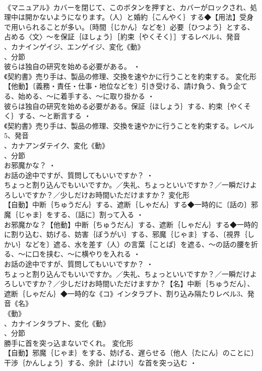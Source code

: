 \documentclass[8pt]{extreport}
\begin{document}
\begin{CJK}{UTF8}{min}
\\	《マニュアル》カバーを閉じて、このボタンを押すと、カバーがロックされ、処理中は開かないようになります。（人）と婚約｛こんやく｝する◆【用法】受身で用いられることが多い。〔時間｛じかん｝などを〕必要｛ひつよう｝とする、占める〈文〉～を保証｛ほしょう｝［約束｛やくそく｝］するレベル4、発音
\\	、カナインゲイジ、エンゲイジ、変化《動》
\\	、分節
\\	彼らは独自の研究を始める必要がある。 ・
\\	《契約書》売り手は、製品の修理、交換を速やかに行うことを約束する。	変化形 
\\	【他動】〔義務・責任・仕事・地位などを〕引き受ける、請け負う、負う企てる、始める、～に着手する、～に取り掛かる ・
\\	彼らは独自の研究を始める必要がある。保証｛ほしょう｝する、約束｛やくそく｝する、～と断言する ・
\\	《契約書》売り手は、製品の修理、交換を速やかに行うことを約束する。レベル5、発音
\\	、カナアンダテイク、変化《動》
\\	、分節
\\	お邪魔かな？ ・
\\	お話の途中ですが、質問してもいいですか？ ・
\\	ちょっと割り込んでもいいですか。／失礼、ちょっといいですか？／一瞬だけよろしいですか？／少しだけお時間いただけますか？	変化形 
\\	【自動】中断｛ちゅうだん｝する、遮断｛しゃだん｝する◆一時的に〔話の〕邪魔｛じゃま｝をする、〔話に〕割って入る ・
\\	お邪魔かな？【他動】中断｛ちゅうだん｝する、遮断｛しゃだん｝する◆一時的に割り込む、妨げる、妨害｛ぼうがい｝する、邪魔｛じゃま｝する、〔視界｛しかい｝などを〕遮る、水を差す（人）の言葉｛ことば｝を遮る、～の話の腰を折る、～に口を挟む、～に横やりを入れる ・
\\	お話の途中ですが、質問してもいいですか？ ・
\\	ちょっと割り込んでもいいですか。／失礼、ちょっといいですか？／一瞬だけよろしいですか？／少しだけお時間いただけますか？【名】中断｛ちゅうだん｝、遮断｛しゃだん｝◆一時的な《コ》インタラプト、割り込み隔たりレベル3、発音《名》
\\	《動》
\\	、カナインタラプト、変化《動》
\\	、分節
\\	勝手に首を突っ込まないでくれ。	変化形 
\\	【自動】邪魔｛じゃま｝をする、妨げる、遅らせる〔他人｛たにん｝のことに〕干渉｛かんしょう｝する、余計｛よけい｝な首を突っ込む ・

\end{CJK}
\end{document}
